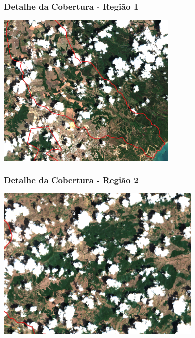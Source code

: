 \documentclass{beamer}
\begin{document}
\begin{frame}
    \frametitle{Detalhe da Cobertura - Região 1}
    \begin{center}
        \includegraphics[width=0.9\linewidth,height=7.5cm,keepaspectratio]{images/zoom1.png}
    \end{center}
    
    \centering
\end{frame}

\begin{frame}
    \frametitle{Detalhe da Cobertura - Região 2}
    \begin{center}
        \includegraphics[width=0.9\linewidth,height=7.5cm,keepaspectratio]{images/zoom2.png}
    \end{center}
    
    \centering
\end{frame}
\end{document}

